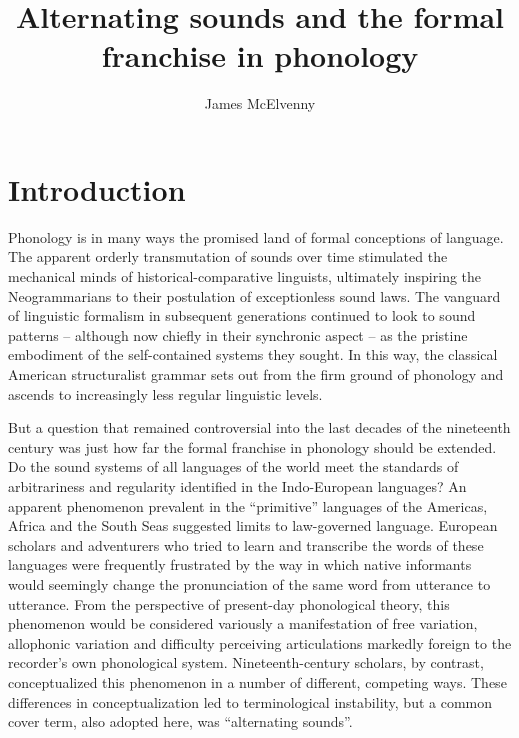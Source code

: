 \documentclass[output=paper]{langscibook}
\author{James McElvenny\affiliation{University of Edinburgh}}
\title{Alternating sounds and the formal franchise in phonology}
\begin{document}
\maketitle

\section{Introduction}
\label{sec:mcelvenny:intro}

Phonology is in many ways the promised land of formal conceptions of language. The apparent orderly transmutation of sounds over time stimulated the mechanical minds of historical-comparative linguists, ultimately inspiring the Neogrammarians to their postulation of exceptionless sound laws. The vanguard of linguistic formalism in subsequent generations continued to look to sound patterns -- although now chiefly in their synchronic aspect -- as the pristine embodiment of the self-contained systems they sought. In this way, the classical American structuralist grammar sets out from the firm ground of phonology and ascends to increasingly less regular linguistic levels.

But a question that remained controversial into the last decades of the nineteenth century was just how far the formal franchise in phonology should be extended. Do the sound systems of all languages of the world meet the standards of arbitrariness and regularity identified in the Indo-European languages? An apparent phenomenon prevalent in the ``primitive'' languages of the Americas, Africa and the South Seas suggested limits to law-governed language. European scholars and adventurers who tried to learn and transcribe the words of these languages were frequently frustrated by the way in which native informants would seemingly change the pronunciation of the same word from utterance to utterance. From the perspective of present-day phonological theory, this phenomenon would be considered variously a manifestation of free variation, allophonic variation and difficulty perceiving articulations markedly foreign to the recorder's own phonological system. Nineteenth-century scholars, by contrast, conceptualized this phenomenon in a number of different, competing ways. These differences in conceptualization led to terminological instability, but a common cover term, also adopted here, was ``alternating sounds''.
\end{document}
